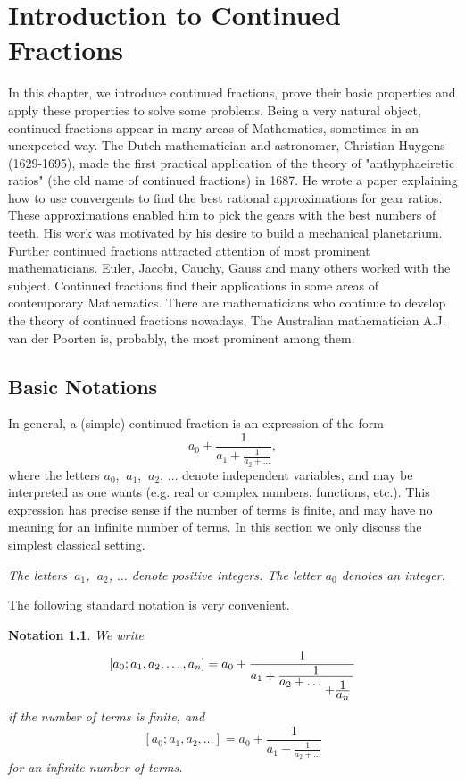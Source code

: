 \documentclass[12pt,letterpaper]{book}
\newtheorem{notation}{Notation}
\begin{document}
\chapter{Introduction to Continued Fractions}
In this chapter, we introduce continued fractions, prove their basic
properties and apply these properties to solve some problems. Being
a very natural object, continued fractions appear in many areas of
Mathematics, sometimes in an unexpected way. The Dutch mathematician
and astronomer, Christian Huygens (1629-1695), made the first
practical application of the theory of "anthyphaeiretic ratios" (the
old name of continued fractions) in 1687. He wrote a paper
explaining how to use convergents to find the best rational
approximations for gear ratios. These approximations enabled him to
pick the gears with the best numbers of teeth. His work was
motivated by his desire to build a mechanical planetarium. Further
continued fractions attracted attention of most prominent
mathematicians. Euler, Jacobi, Cauchy, Gauss and many others worked
with the subject. Continued fractions find their applications in
some areas of contemporary Mathematics. There are mathematicians who
continue to develop the theory of continued fractions nowadays, The
Australian mathematician A.J. van der Poorten is, probably, the most
prominent among them.




\section{Basic Notations}
In general,  a (simple) continued
fraction is an expression of the form
$$
a_0 + \frac{1}{a_1+\frac{\displaystyle 1}{\displaystyle a_2+
\ldots}},
$$
where the letters $a_0$, $\ a_1$, $\ a_2$, $\ldots$ denote
independent variables, and may be interpreted as one wants (e.g.
real or complex numbers, functions, etc.). This expression has
precise sense if the number of terms is finite, and may have no
meaning for an infinite number of terms. In this section we only
discuss the simplest classical setting.

\begin{center}{\it The letters $\ a_1$, $\ a_2$, $\ldots$ denote positive integers. The letter
$a_0$ denotes an integer.}
\end{center}

The following standard notation is very convenient.

\begin{notation}
We write
$$
[a_0; a_1,a_2, \ldots, a_n] = a_0 + \frac{1}{a_1+\frac{\displaystyle
1} {\displaystyle a_2+ \ldots
\genfrac{}{}{0cm}{0}{}{+\frac{\displaystyle 1}{\displaystyle a_n}}
}}
$$
if the number of terms is finite, and
$$
[a_0; a_1,a_2, \ldots] = a_0 + \frac{1}{a_1+\frac{\displaystyle
1}{\displaystyle a_2+ \ldots}}
$$
for an infinite number of terms.
\end{notation}
\end{document}
